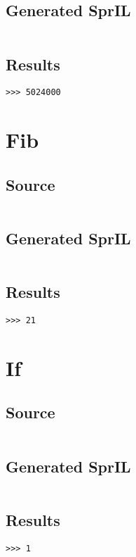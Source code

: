 \documentclass[twoside]{report}
\begin{document}
\subsection{Generated SprIL}
\inputminted[tabsize=4,linenos,firstnumber=0]{text}{../test/deep_expression_gen.txt}
\subsection{Results}
\begin{verbatim}
>>> 5024000
\end{verbatim}

\section{Fib}
\subsection{Source}
\inputminted[tabsize=4,linenos,firstnumber=1]{text}{../test/fib.shl}
\subsection{Generated SprIL}
\inputminted[tabsize=4,linenos,firstnumber=0]{text}{../test/fib_gen.txt}
\subsection{Results}
\begin{verbatim}
>>> 21
\end{verbatim}

\section{If}
\subsection{Source}
\inputminted[tabsize=4,linenos,firstnumber=1]{text}{../test/if.shl}
\subsection{Generated SprIL}
\inputminted[tabsize=4,linenos,firstnumber=0]{text}{../test/if_gen.txt}
\subsection{Results}
\begin{verbatim}
>>> 1
\end{verbatim}
\end{document}
